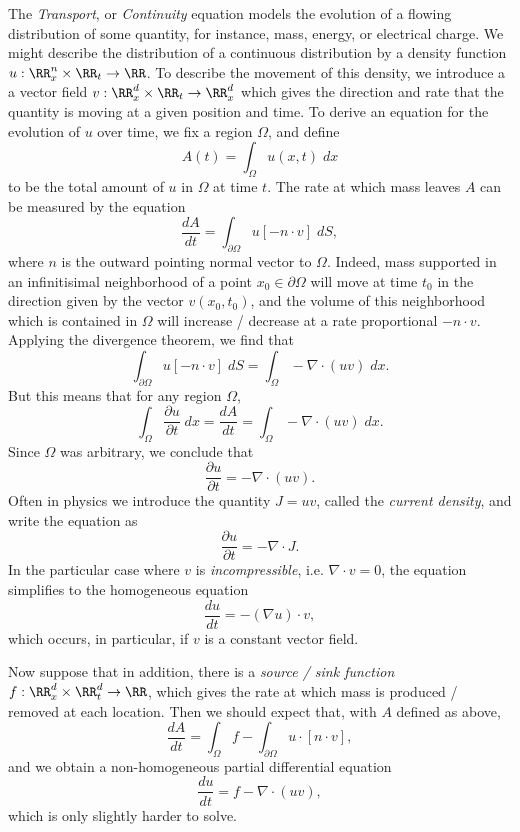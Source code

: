 The \emph{Transport}, or \emph{Continuity} equation models the evolution of a flowing distribution of some quantity, for instance, mass, energy, or electrical charge. We might describe the distribution of a continuous distribution by a density function $u: \RR^n_x \times \RR_t \to \RR$. To describe the movement of this density, we introduce a a vector field $v: \RR^d_x \times \RR_t \to \RR^d_x$ which gives the direction and rate that the quantity is moving at a given position and time. To derive an equation for the evolution of $u$ over time, we fix a region $\Omega$, and define
%
\[ A(t) = \int_\Omega u(x,t)\; dx \]
to be the total amount of $u$ in $\Omega$ at time $t$. The rate at which mass leaves $A$ can be measured by the equation
%
\[ \frac{dA}{dt} = \int_{\partial \Omega} u [- n \cdot v]\; dS, \]
%
where $n$ is the outward pointing normal vector to $\Omega$. Indeed, mass supported in an infinitisimal neighborhood of a point $x_0 \in \partial \Omega$ will move at time $t_0$ in the direction given by the vector $v(x_0,t_0)$, and the volume of this neighborhood which is contained in $\Omega$ will increase / decrease at a rate proportional $- n \cdot v$. Applying the divergence theorem, we find that
%
\[ \int_{\partial \Omega} u [-n \cdot v]\; dS = \int_\Omega - \nabla \cdot (uv)\; dx. \]
%
But this means that for any region $\Omega$,
%
\[ \int_\Omega \frac{\partial u}{\partial t}\; dx = \frac{dA}{dt} = \int_\Omega - \nabla \cdot (uv)\; dx. \]
%
Since $\Omega$ was arbitrary, we conclude that
%
\[ \frac{\partial u}{\partial t} = - \nabla \cdot (uv). \]
%
Often in physics we introduce the quantity $J = uv$, called the \emph{current density}, and write the equation as
%
\[ \frac{\partial u}{\partial t} = - \nabla \cdot J. \]
%
In the particular case where $v$ is \emph{incompressible}, i.e. $\nabla \cdot v = 0$, the equation simplifies to the homogeneous equation
%
\[ \frac{du}{dt} = - (\nabla u) \cdot v, \]
%
which occurs, in particular, if $v$ is a constant vector field.

Now suppose that in addition, there is a \emph{source / sink function} $f: \RR^d_x \times \RR^d_t \to \RR$, which gives the rate at which mass is produced / removed at each location. Then we should expect that, with $A$ defined as above,
%
\[ \frac{dA}{dt} = \int_\Omega f - \int_{\partial \Omega} u \cdot [n \cdot v], \]
%
and we obtain a non-homogeneous partial differential equation
%
\[ \frac{du}{dt} = f - \nabla \cdot (uv), \]
%
which is only slightly harder to solve.


